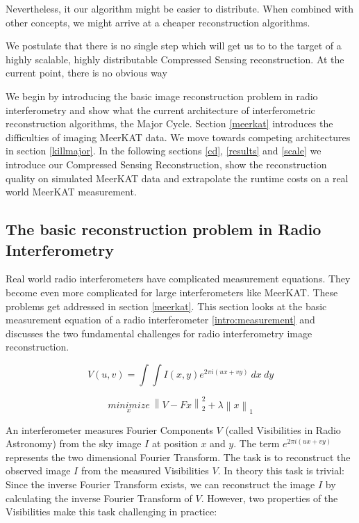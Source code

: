Nevertheless, it our algorithm might be easier to distribute. When combined with other concepts, we might arrive at a cheaper reconstruction algorithms.

We postulate that there is no single step which will get us to to the target of a highly scalable, highly distributable Compressed Sensing reconstruction. At the current point, there is no obvious way

We begin by introducing the basic image reconstruction problem in radio interferometry and show what the current architecture of interferometric reconstruction algorithms, the Major Cycle. Section \ref{meerkat} introduces the difficulties of imaging MeerKAT data. We  move towards competing architectures in section \ref{killmajor}. In the following sections \ref{cd}, \ref{results} and \ref{scale} we introduce our Compressed Sensing Reconstruction, show the reconstruction quality on simulated MeerKAT data and extrapolate the runtime costs on a real world MeerKAT measurement.

\subsection{The basic reconstruction problem in Radio Interferometry}\label{intro:basic}
Real world radio interferometers have complicated measurement equations. They become even more complicated for large interferometers like MeerKAT. These problems get addressed in section \ref{meerkat}. This section looks at the basic measurement equation of a radio interferometer \eqref{intro:measurement} and discusses the two fundamental challenges for radio interferometry image reconstruction. 

\begin{equation}\label{intro:measurement}
V(u, v) = \int\int I(x, y) e^{2 \pi i (ux+vy)} \: dx \: dy
\end{equation}

\begin{equation}\label{intro:cs}
\underset{x}{minimize} \: \left \| V - Fx \right \|_2^2 + \lambda \left \| x \right \|_1
\end{equation}



An interferometer measures Fourier Components $V$ (called Visibilities in Radio Astronomy) from the sky image $I$ at position $x$ and $y$. The term $e^{2 \pi i (ux+vy)}$ represents the two dimensional Fourier Transform. The task is to reconstruct the observed image $I$ from the measured Visibilities $V$. In theory this task is trivial: Since the inverse Fourier Transform exists, we can reconstruct the image $I$ by calculating the inverse Fourier Transform of $V$. However, two properties of the Visibilities make this task challenging in practice:

